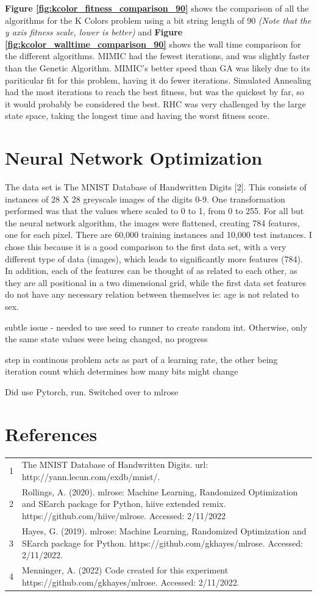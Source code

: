 \documentclass[letterpaper]{article} %
\begin{document}
\textbf{Figure \ref{fig:kcolor_fitness_comparison_90}} shows the comparison of all the algorithms for the K Colors problem using a bit string length of 90 \emph{(Note that the y axis fitness scale, lower is better)} and \textbf{Figure \ref{fig:kcolor_walltime_comparison_90}} shows the wall time comparison for the different algorithms.  MIMIC had the fewest iterations, and was slightly faster than the Genetic Algorithm.  MIMIC's better speed than GA was likely due to its pariticular fit for this problem, having it do fewer iterations.  Simulated Annealing had the most iterations to reach the best fitness, but was the quickest by far, so it would probably be considered the best.  RHC was very challenged by the large state space, taking the longest time and having the worst fitness score.

\section{Neural Network Optimization}

The data set is The MNIST Database of Handwritten Digits [2].  This consists of instances of 28 X 28 greyscale images of the digits 0-9.  One transformation performed was that the values where scaled to 0 to 1, from 0 to 255.  For all but the neural network algorithm,  the images were flattened, creating 784 features, one for each pixel.  There are 60,000 training instances and 10,000 test instances.  I chose this because it is a good comparison to the first data set, with a very different type of data (images), which leads to significantly more features (784).  In addition, each of the features can be thought of as related to each other, as they are all positional in a two dimensional grid, while the first data set features do not have any necessary relation between themselves ie:  age is not related to sex.  

subtle issue - needed to use seed to runner to create random int.  Otherwise, only the same state values were being changed, no progress

step in continous problem acts as part of a learning rate, the other being iteration count which determines how many bits might change

Did use Pytorch, run.  Switched over to mlrose


\section{References}
\begin{tabular}{l p{2.75in}}
\\
1 & The MNIST Database of Handwritten Digits. url: http://yann.lecun.com/exdb/mnist/.
\\
2 & Rollings, A. (2020). mlrose: Machine Learning, Randomized Optimization and SEarch package for Python, hiive extended remix. https://github.com/hiive/mlrose. Accessed: 2/11/2022
\\
3 & Hayes, G. (2019). mlrose: Machine Learning, Randomized Optimization and SEarch package for Python. https://github.com/gkhayes/mlrose. Accessed: 2/11/2022.
\\
4 & Menninger, A. (2022)  Code created for this experiment https://github.com/gkhayes/mlrose. Accessed: 2/11/2022.
\end{tabular}
\end{document}
